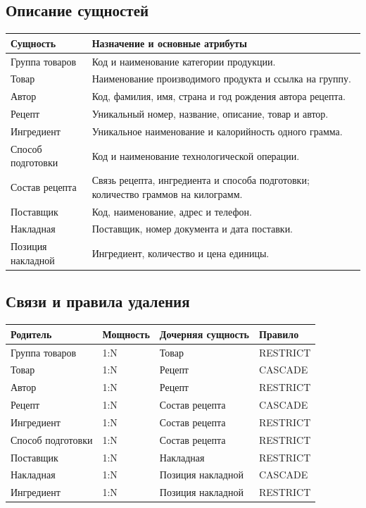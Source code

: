 \documentclass[14pt,a4paper]{extarticle}
\begin{document}
\subsection{Описание сущностей}

\begin{longtable}{L{0.28\textwidth} L{0.62\textwidth}}
\toprule
\textbf{Сущность} & \textbf{Назначение и основные атрибуты} \\
\midrule
\endhead
Группа товаров & Код и наименование категории продукции. \\
Товар & Наименование производимого продукта и ссылка на группу. \\
Автор & Код, фамилия, имя, страна и год рождения автора рецепта. \\
Рецепт & Уникальный номер, название, описание, товар и автор. \\
Ингредиент & Уникальное наименование и калорийность одного грамма. \\
Способ подготовки & Код и наименование технологической операции. \\
Состав рецепта & Связь рецепта, ингредиента и способа подготовки; количество граммов на килограмм. \\
Поставщик & Код, наименование, адрес и телефон. \\
Накладная & Поставщик, номер документа и дата поставки. \\
Позиция накладной & Ингредиент, количество и цена единицы. \\
\bottomrule
\end{longtable}

\subsection{Связи и правила удаления}

\begin{longtable}{L{0.25\textwidth} L{0.18\textwidth} L{0.25\textwidth} L{0.20\textwidth}}
\toprule
\textbf{Родитель} & \textbf{Мощность} & \textbf{Дочерняя сущность} & \textbf{Правило} \\
\midrule
\endhead
Группа товаров & 1:N & Товар & RESTRICT \\
Товар & 1:N & Рецепт & CASCADE \\
Автор & 1:N & Рецепт & RESTRICT \\
Рецепт & 1:N & Состав рецепта & CASCADE \\
Ингредиент & 1:N & Состав рецепта & RESTRICT \\
Способ подготовки & 1:N & Состав рецепта & RESTRICT \\
Поставщик & 1:N & Накладная & RESTRICT \\
Накладная & 1:N & Позиция накладной & CASCADE \\
Ингредиент & 1:N & Позиция накладной & RESTRICT \\
\bottomrule
\end{longtable}
\end{document}
